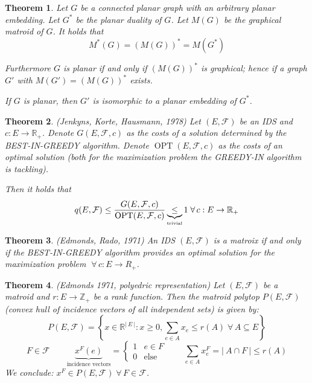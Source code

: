 \documentclass{article}
\newtheorem{theorem}{Theorem}
\newcommand{\card}[1]{\left|\:\!#1\:\!\right|}
\newcommand{\set}[1]{\left\{#1\right\}}
\newcommand{\fall}{\;\forall\,}
\begin{document}
\begin{theorem}
  \label{satz-8.11}
  Let $G$ be a connected planar graph with an arbitrary planar embedding.
  Let $G^*$ be the planar duality of $G$. Let $M(G)$ be the graphical matroid of $G$.
  It holds that
    \[ M^*(G) = (M(G))^* = M(G^*) \]

  Furthermore $G$ is planar if and only if $(M(G))^*$ is graphical;
  hence if a graph $G'$ with $M(G') = (M(G))^*$ exists.

  If $G$ is planar, then $G'$ is isomorphic to a planar embedding of $G^*$.
\end{theorem}
\begin{theorem}
  \label{satz-8.12}
  (Jenkyns, Korte, Hausmann, 1978)
  Let $(E, \mathcal{F})$ be an IDS and $c: E \rightarrow \mathbb{R}_+$. Denote $G(E, \mathcal{F}, c)$ as the costs of a solution determined by the BEST-IN-GREEDY algorithm. Denote $\operatorname{OPT}(E, \mathcal{F}, c)$ as the costs of an optimal solution (both for the maximization problem the GREEDY-IN algorithm is tackling).

  Then it holds that
  \[
      q(E, \mathcal{F})
        \leq \frac{G(E, \mathcal{F}, c)}{\operatorname{OPT}(E, \mathcal{F}, c)}
        \underbrace{\leq}_{\text{\tiny{trivial}}} 1
        \fall c: E \rightarrow \mathbb{R}_+
  \]
\end{theorem}
\begin{theorem}
  \label{satz-8.13}
  (Edmonds, Rado, 1971)
  An IDS $(E, \mathcal{F})$ is a matroix if and only if the BEST-IN-GREEDY algorithm provides an optimal solution for the maximization problem $\fall c: E \rightarrow{R}_+$.
\end{theorem}
\begin{theorem}
  \label{satz-8.14}
  (Edmonds 1971, polyedric representation)
  Let $(E, \mathcal{F})$ be a matroid and $r: E \rightarrow \mathbb{Z}_+$ be a rank function.
  Then the matroid polytop $P(E, \mathcal{F})$ (convex hull of incidence vectors of all independent sets) is given by:
  \[ P(E, \mathcal{F}) = \set{x \in \mathbb{R}^{\card{E}}: x \geq 0, \sum_{e \in A} x_e \leq r(A) \fall A \subseteq E} \]
  \[
    F \in \mathcal{F}  \qquad
    \underbrace{x^F(e)}_{\text{incidence vectors}} = \begin{cases} 1 & e \in F \\ 0 & \text{else} \end{cases} \qquad
    \sum_{e \in A} x^F_e = \card{A \cap F} \leq r(A)
  \]
  We conclude: $x^F \in P(E, \mathcal{F}) \fall F \in \mathcal{F}$.
\end{theorem}
\end{document}
